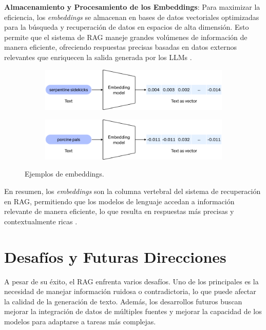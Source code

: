 \textbf{Almacenamiento y Procesamiento de los Embeddings}: Para maximizar la eficiencia, los \textit{embeddings} se almacenan en bases de datos vectoriales optimizadas para la búsqueda y recuperación de datos en espacios de alta dimensión. Esto permite que el sistema de RAG maneje grandes volúmenes de información de manera eficiente, ofreciendo respuestas precisas basadas en datos externos relevantes que enriquecen la salida generada por los LLMs \cite{nanonets2023rag}.

\begin{figure}[h]
    \centering
    \begin{subfigure}[b]{0.45\textwidth}
        \centering
        \includegraphics[width=\textwidth]{figuras/capitulo2/vectors-3.png}
        \label{fig:rag1}
    \end{subfigure}
    \hfill
    \begin{subfigure}[b]{0.45\textwidth}
        \centering
        \includegraphics[width=\textwidth]{figuras/capitulo2/vectors-2.png}
        \label{fig:rag2}
    \end{subfigure}
    \caption{Ejemplos de embeddings. \citep{openai}}
    \label{fig:embeddigns}
\end{figure}


En resumen, los \textit{embeddings} son la columna vertebral del sistema de recuperación en RAG, permitiendo que los modelos de lenguaje accedan a información relevante de manera eficiente, lo que resulta en respuestas más precisas y contextualmente ricas \cite{cloudgirl2023rag, nvidia2023rag}.


\section{Desafíos y Futuras Direcciones}

A pesar de su éxito, el RAG enfrenta varios desafíos. Uno de los principales es la necesidad de manejar información ruidosa o contradictoria, lo que puede afectar la calidad de la generación de texto. Además, los desarrollos futuros buscan mejorar la integración de datos de múltiples fuentes y mejorar la capacidad de los modelos para adaptarse a tareas más complejas.

